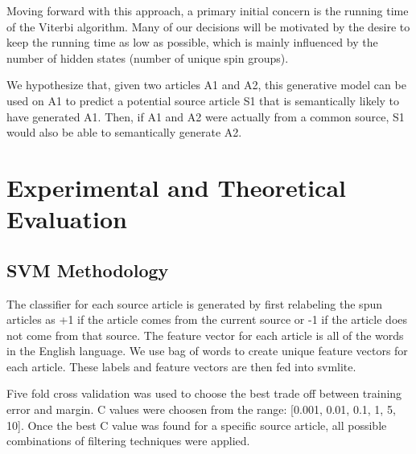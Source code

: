 \documentclass[11pt,letterpaper,oneside, titlepage]{scrartcl}
\begin{document}
Moving forward with this approach, a primary initial concern is the running time of the Viterbi algorithm. Many of our decisions will be motivated by the desire to keep the running time as low as possible, which is mainly influenced by the number of hidden states (number of unique spin groups).

We hypothesize that, given two articles A1 and A2, this generative model can be used on A1 to predict a potential source article S1 that is semantically likely to have generated A1. Then, if A1 and A2 were actually from a common source, S1 would also be able to semantically generate A2.


\section{Experimental and Theoretical Evaluation }



\subsection{SVM Methodology}


The classifier for each source article is generated by first relabeling the spun articles as +1 if the article comes from the current source or -1 if the article does not come from that source. The feature vector for each article is all of the words in the English language. We use bag of words to create unique feature vectors for each article. These labels and feature vectors are then fed into svmlite. 

Five fold cross validation was used to choose the best trade off between training error and margin. C values were choosen from the range: [0.001, 0.01, 0.1, 1, 5, 10]. Once the best C value was found for a specific source article, all possible combinations of filtering techniques were applied. 
\end{document}

